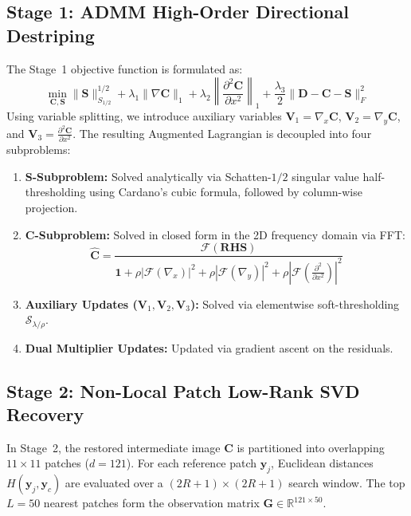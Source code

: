 \documentclass[lettersize,journal]{IEEEtran}
\begin{document}
\subsection{Stage 1: ADMM High-Order Directional Destriping}
The Stage~1 objective function is formulated as:
\begin{equation}
    \min_{\mathbf{C}, \mathbf{S}} \|\mathbf{S}\|_{S_{1/2}}^{1/2} + \lambda_1 \|\nabla \mathbf{C}\|_1 + \lambda_2 \left\| \frac{\partial^2 \mathbf{C}}{\partial x^2} \right\|_1 + \frac{\lambda_3}{2} \|\mathbf{D} - \mathbf{C} - \mathbf{S}\|_F^2
\end{equation}
Using variable splitting, we introduce auxiliary variables $\mathbf{V}_1 = \nabla_x \mathbf{C}$, $\mathbf{V}_2 = \nabla_y \mathbf{C}$, and $\mathbf{V}_3 = \frac{\partial^2 \mathbf{C}}{\partial x^2}$. The resulting Augmented Lagrangian is decoupled into four subproblems:
\begin{enumerate}
    \item \textbf{$\mathbf{S}$-Subproblem:} Solved analytically via Schatten-$1/2$ singular value half-thresholding using Cardano's cubic formula, followed by column-wise projection.
    \item \textbf{$\mathbf{C}$-Subproblem:} Solved in closed form in the 2D frequency domain via FFT:
    \begin{equation}
        \hat{\mathbf{C}} = \frac{\mathcal{F}(\mathbf{RHS})}{\mathbf{1} + \rho |\mathcal{F}(\nabla_x)|^2 + \rho |\mathcal{F}(\nabla_y)|^2 + \rho \left|\mathcal{F}\left(\frac{\partial^2}{\partial x^2}\right)\right|^2}
    \end{equation}
    \item \textbf{Auxiliary Updates ($\mathbf{V}_1, \mathbf{V}_2, \mathbf{V}_3$):} Solved via elementwise soft-thresholding $\mathcal{S}_{\lambda/\rho}$.
    \item \textbf{Dual Multiplier Updates:} Updated via gradient ascent on the residuals.
\end{enumerate}

\subsection{Stage 2: Non-Local Patch Low-Rank SVD Recovery}
In Stage~2, the restored intermediate image $\mathbf{C}$ is partitioned into overlapping $11 \times 11$ patches ($d = 121$). For each reference patch $\mathbf{y}_j$, Euclidean distances $H(\mathbf{y}_j, \mathbf{y}_c)$ are evaluated over a $(2R+1) \times (2R+1)$ search window. The top $L = 50$ nearest patches form the observation matrix $\mathbf{G} \in \mathbb{R}^{121 \times 50}$.
\end{document}
